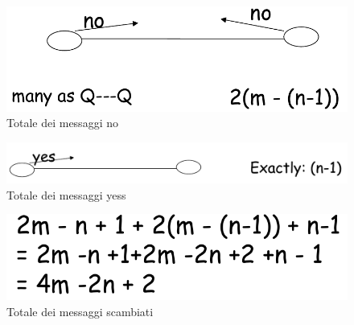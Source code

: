\documentclass[12pt]{article}
\begin{document}
			\begin{figure}[h!]
				\centering
				\includegraphics[scale=0.250]{img/numbno.png}
				\caption{Totale dei messaggi no}
			\end{figure}
			\begin{figure}[h!]
				\centering
				\includegraphics[scale=0.25]{img/numbyess.png}
				\caption{Totale dei messaggi yess}
			\end{figure}
			\begin{figure}[h!]
				\centering
				\includegraphics[scale=0.25]{img/totmess.png}
				\caption{Totale dei messaggi scambiati}
			\end{figure}
		
			\newpage
\end{document}
